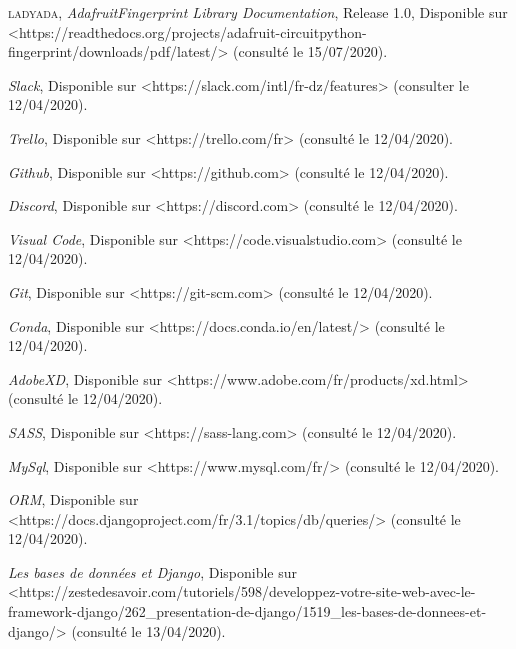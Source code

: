 \begin{thebibliography}{2}
         \textsc{ladyada}, \emph{AdafruitFingerprint Library Documentation}, Release 1.0, Disponible sur \\<https://readthedocs.org/projects/adafruit-circuitpython-fingerprint/downloads/pdf/latest/> (consulté le 15/07/2020).
        
        \emph{Slack}, Disponible sur <https://slack.com/intl/fr-dz/features> (consulter le 12/04/2020).
        
        \emph{Trello}, Disponible sur <https://trello.com/fr> (consulté le 12/04/2020).
        
        \emph{Github}, Disponible sur <https://github.com> (consulté le 12/04/2020).
        
        \emph{Discord}, Disponible sur <https://discord.com> (consulté le 12/04/2020).
        
        \emph{Visual Code}, Disponible sur <https://code.visualstudio.com> (consulté le 12/04/2020).
        
        \emph{Git}, Disponible sur <https://git-scm.com> (consulté le 12/04/2020).
        
        \emph{Conda}, Disponible sur <https://docs.conda.io/en/latest/> (consulté le 12/04/2020).
        
        \emph{AdobeXD}, Disponible sur <https://www.adobe.com/fr/products/xd.html> (consulté le 12/04/2020).
        
        \emph{SASS}, Disponible sur <https://sass-lang.com> (consulté le 12/04/2020).
        
        \emph{MySql}, Disponible sur <https://www.mysql.com/fr/> (consulté le 12/04/2020).
        
        \emph{ORM}, Disponible sur <https://docs.djangoproject.com/fr/3.1/topics/db/queries/> (consulté le 12/04/2020).
        
        \emph{Les bases de données et Django}, Disponible sur <https://zestedesavoir.com/tutoriels/598/developpez-votre-site-web-avec-le-framework-django/262\_presentation-de-django/1519\_les-bases-de-donnees-et-django/> (consulté le 13/04/2020).


		
\end{thebibliography}